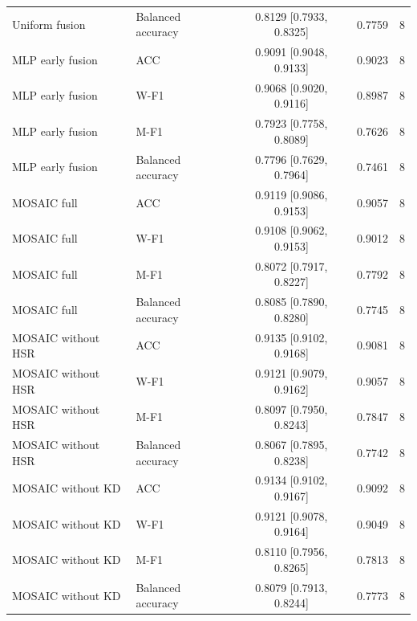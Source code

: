 \begin{tabular}{llccc}
Uniform fusion & Balanced accuracy & 0.8129 [0.7933, 0.8325] & 0.7759 & 8 \\
MLP early fusion & ACC & 0.9091 [0.9048, 0.9133] & 0.9023 & 8 \\
MLP early fusion & W-F1 & 0.9068 [0.9020, 0.9116] & 0.8987 & 8 \\
MLP early fusion & M-F1 & 0.7923 [0.7758, 0.8089] & 0.7626 & 8 \\
MLP early fusion & Balanced accuracy & 0.7796 [0.7629, 0.7964] & 0.7461 & 8 \\
MOSAIC full & ACC & 0.9119 [0.9086, 0.9153] & 0.9057 & 8 \\
MOSAIC full & W-F1 & 0.9108 [0.9062, 0.9153] & 0.9012 & 8 \\
MOSAIC full & M-F1 & 0.8072 [0.7917, 0.8227] & 0.7792 & 8 \\
MOSAIC full & Balanced accuracy & 0.8085 [0.7890, 0.8280] & 0.7745 & 8 \\
MOSAIC without HSR & ACC & 0.9135 [0.9102, 0.9168] & 0.9081 & 8 \\
MOSAIC without HSR & W-F1 & 0.9121 [0.9079, 0.9162] & 0.9057 & 8 \\
MOSAIC without HSR & M-F1 & 0.8097 [0.7950, 0.8243] & 0.7847 & 8 \\
MOSAIC without HSR & Balanced accuracy & 0.8067 [0.7895, 0.8238] & 0.7742 & 8 \\
MOSAIC without KD & ACC & 0.9134 [0.9102, 0.9167] & 0.9092 & 8 \\
MOSAIC without KD & W-F1 & 0.9121 [0.9078, 0.9164] & 0.9049 & 8 \\
MOSAIC without KD & M-F1 & 0.8110 [0.7956, 0.8265] & 0.7813 & 8 \\
MOSAIC without KD & Balanced accuracy & 0.8079 [0.7913, 0.8244] & 0.7773 & 8 \\
\bottomrule
\end{tabular}
